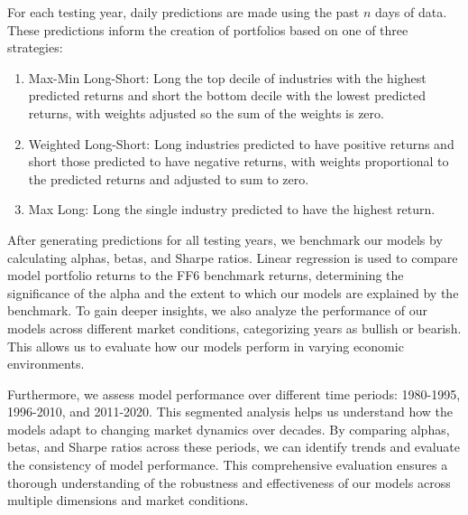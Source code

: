 \documentclass{article}
\begin{document}
For each testing year, daily predictions are made using the past $n$ days of data. These predictions inform the creation of portfolios based on one of three strategies:
\begin{enumerate}[label={(\arabic*)}]
    \item {Max-Min Long-Short}: Long the top decile of industries with the highest predicted returns and short the bottom decile with the lowest predicted returns, with weights adjusted so the sum of the weights is zero.
    \item {Weighted Long-Short}: Long industries predicted to have positive returns and short those predicted to have negative returns, with weights proportional to the predicted returns and adjusted to sum to zero.
    \item {Max Long}: Long the single industry predicted to have the highest return.
\end{enumerate}


After generating predictions for all testing years, we benchmark our models by calculating alphas, betas, and Sharpe ratios. Linear regression is used to compare model portfolio returns to the FF6 benchmark returns, determining the significance of the alpha and the extent to which our models are explained by the benchmark. To gain deeper insights, we also analyze the performance of our models across different market conditions, categorizing years as bullish or bearish. This allows us to evaluate how our models perform in varying economic environments.

Furthermore, we assess model performance over different time periods: 1980-1995, 1996-2010, and 2011-2020. This segmented analysis helps us understand how the models adapt to changing market dynamics over decades. By comparing alphas, betas, and Sharpe ratios across these periods, we can identify trends and evaluate the consistency of model performance. This comprehensive evaluation ensures a thorough understanding of the robustness and effectiveness of our models across multiple dimensions and market conditions.
\end{document}
